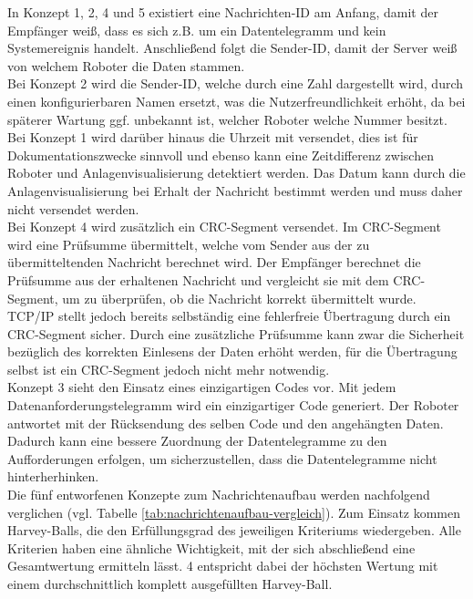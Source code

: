 \documentclass[ a4paper,
                oneside,
                toc=bibliography,
                toc=listof
                ]{scrbook}
\begin{document}
	In Konzept 1, 2, 4 und 5 existiert eine Nachrichten-ID am Anfang, damit der Empfänger weiß, dass es sich z.B. um ein Datentelegramm und kein Systemereignis handelt. Anschließend folgt die Sender-ID, damit der Server weiß von welchem Roboter die Daten stammen.\\
	Bei Konzept 2 wird die Sender-ID, welche durch eine Zahl dargestellt wird, durch einen konfigurierbaren Namen ersetzt, was die Nutzerfreundlichkeit erhöht, da bei späterer Wartung ggf. unbekannt ist, welcher Roboter welche Nummer besitzt. \\
	Bei Konzept 1 wird darüber hinaus die Uhrzeit mit versendet, dies ist für Dokumentationszwecke sinnvoll und ebenso kann eine Zeitdifferenz zwischen Roboter und Anlagenvisualisierung detektiert werden. Das Datum kann durch die Anlagenvisualisierung bei Erhalt der Nachricht bestimmt werden und muss daher nicht versendet werden. \\
	Bei Konzept 4 wird zusätzlich ein CRC-Segment versendet. Im CRC-Segment wird eine Prüfsumme übermittelt, welche vom Sender aus der zu übermitteltenden Nachricht berechnet wird. Der Empfänger berechnet die Prüfsumme aus der erhaltenen Nachricht und vergleicht sie mit dem CRC-Segment, um zu überprüfen, ob die Nachricht korrekt übermittelt wurde. TCP/IP stellt jedoch bereits selbständig eine fehlerfreie Übertragung durch ein CRC-Segment sicher. Durch eine zusätzliche Prüfsumme kann zwar die Sicherheit bezüglich des korrekten Einlesens der Daten erhöht werden, für die Übertragung selbst ist ein CRC-Segment jedoch nicht mehr notwendig. \\
	Konzept 3 sieht den Einsatz eines einzigartigen Codes vor. Mit jedem Datenanforderungstelegramm wird ein einzigartiger Code generiert. Der Roboter antwortet mit der Rücksendung des selben Code und den angehängten Daten. Dadurch kann eine bessere Zuordnung der Datentelegramme zu den Aufforderungen erfolgen, um sicherzustellen, dass die Datentelegramme nicht hinterherhinken.\\
	Die fünf entworfenen Konzepte zum Nachrichtenaufbau werden nachfolgend verglichen (vgl. Tabelle \ref{tab:nachrichtenaufbau-vergleich}). Zum Einsatz kommen Harvey-Balls, die den Erfüllungsgrad des jeweiligen Kriteriums wiedergeben. Alle Kriterien haben eine ähnliche Wichtigkeit, mit der sich abschließend eine Gesamtwertung ermitteln lässt. 4 entspricht dabei der höchsten Wertung mit einem durchschnittlich komplett ausgefüllten Harvey-Ball.
\end{document}
